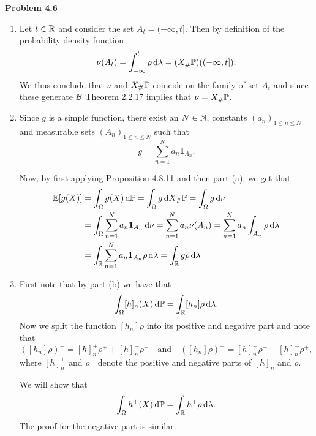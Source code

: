 
\textbf{Problem 4.6}

\begin{enumerate}[label=(\alph*)]
\item Let $t \in \mathbb R$ and consider the set $A_t = (-\infty, t]$. Then by definition of the probability density function
\[
	\nu(A_t) = \int_{-\infty}^t \rho \, \mathrm{d} \lambda = (X_\# \mathbb P)((-\infty, t]).
\]
We thus conclude that $\nu$ and $X_\# \mathbb P$ coincide on the family of set $A_t$ and since these generate $\mathcal B$ Theorem 2.2.17 implies that $\nu = X_\# \mathbb P$.
\item Since $g$ is a simple function, there exist an $N \in \mathbb N$, constants $(a_n)_{1 \le n \le N}$ and measurable sets $(A_n)_{1 \le n \le N}$ such that
\[
	g = \sum_{n = 1}^N a_n \mathbf{1}_{A_n}.
\]

Now, by first applying Proposition 4.8.11 and then part (a), we get that
\begin{align*}
	\mathbb E[g(X)] &= \int_{\Omega} g(X) \, \mathrm{d} \mathbb P
		= \int_{\Omega} g \, \mathrm{d} X_\# \mathbb P 
		= \int_\Omega g \, \mathrm{d} \nu \\
	&= \int_\Omega \sum_{n = 1}^N a_n \mathbf{1}_{A_n} \, \mathrm{d} \nu 
		= \sum_{n = 1}^N a_n \nu(A_n) 
		= \sum_{n = 1}^N a_n \int_{A_n} \rho \, \mathrm{d} \lambda \\
	&= \int_{\mathbb R} \sum_{n = 1}^N a_n \mathbf{1}_{A_n} \rho \, \mathrm{d} \lambda = \int_{\mathbb R} g \rho \, \mathrm{d} \lambda
\end{align*}

\item First note that by part (b) we have that
\[
	\int_\Omega [h]_n(X) \, \mathrm{d} \mathbb P = \int_{\mathbb R} [h_n] \rho \, \mathrm{d} \lambda.
\]
Now we split the function $[h_n] \rho$ into its positive and negative part and note that
\[
	([h_n] \rho)^+ = [h]_n^+ \rho^+ + [h]_n^- \rho^- \quad \text{and} \quad
	([h_n] \rho)^- = [h]_n^+ \rho^- + [h]_n^- \rho^+,
\] 
where $[h]_n^\pm$ and $\rho^\pm$ denote the positive and negative parts of $[h]_n$ and $\rho$.

We will show that 
\[
	\int_\Omega h^+(X) \, \mathrm{d} \mathbb P = \int_{\mathbb R} h^+ \rho \, \mathrm{d} \lambda. 
\]
The proof for the negative part is similar.


\end{enumerate}
